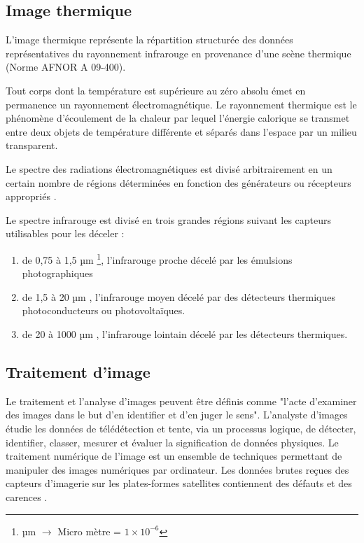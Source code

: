 \documentclass[12pt]{article}
\begin{document}
\subsection{Image thermique}
L'image thermique représente la répartition structurée des données représentatives du rayonnement infrarouge en provenance d'une scène thermique (Norme AFNOR A 09-400).

Tout corps dont la température est supérieure au zéro absolu émet en permanence un rayonnement électromagnétique. Le rayonnement thermique est le phénomène d'écoulement de la chaleur par lequel l'énergie calorique se transmet entre deux objets de température différente et séparés dans l'espace par un milieu transparent.

Le spectre des radiations électromagnétiques est divisé arbitrairement en un certain nombre de régions déterminées en fonction des générateurs ou récepteurs appropriés \cite{40}.

Le spectre infrarouge est divisé en trois grandes régions suivant les capteurs utilisables pour les déceler \cite{41}:
\begin{enumerate}
	\item de 0,75 à 1,5 µm \footnote{µm $\longrightarrow$ Micro mètre  = $1 \times 10^{-6}$}, l'infrarouge proche décelé par les émulsions photographiques
	\item de 1,5 à 20 µm , l'infrarouge moyen décelé par des détecteurs thermiques photoconducteurs ou photovoltaïques.
	\item de 20 à 1000 µm , l'infrarouge lointain décelé par les détecteurs thermiques.
\end{enumerate}

\subsection{Traitement d’image}
Le traitement et l'analyse d'images peuvent être définis comme "l'acte d'examiner des images dans le but d'en identifier et d'en juger le sens". L'analyste d'images étudie les données de télédétection et tente, via un processus logique, de détecter, identifier, classer, mesurer et évaluer la signification de données physiques. Le traitement numérique de l'image est un ensemble de techniques permettant de manipuler des images numériques par ordinateur. Les données brutes reçues des capteurs d’imagerie sur les plates-formes satellites contiennent des défauts et des carences \cite{14}.
\end{document}
